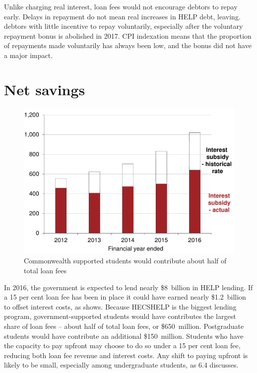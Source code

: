 \documentclass[embargoed]{grattan}
\begin{document}
Unlike charging real interest, loan fees would not encourage debtors to repay early.
Delays in repayment do not mean real increases in \gls{HELP} debt, leaving. debtors with little incentive to repay voluntarily, especially after the voluntary repayment bonus is abolished in 2017.
\gls{CPI} indexation means that the proportion of repayments made voluntarily has always been low, and the bonus did not have a major impact.

\section{Net savings}\label{net-savings}

\begin{figure}
\caption{Commonwealth supported students would contribute about half of total loan fees}\label{fig:fig23-Cth-supported-students-would-contr-half-tot-loan-fees}


\includegraphics[page=23]{atlas/Chartpack.pdf}

\end{figure}

In 2016, the government is expected to lend nearly \$8~billion in \gls{HELP} lending.
If a 15 per cent loan fee has been in place it could have earned nearly \$1.2~billion to offset interest costs, as  shows.
Because \gls{HECSHELP} is the biggest lending program, government-supported students would have contributes the largest share of loan fees -- about half of total loan fees, or \$650~million.
Postgraduate students would have contribute an additional \$150~million.
Students who have the capacity to pay upfront may choose to do so under a 15 per cent loan fee, reducing both loan fee revenue and interest costs.
Any shift to paying upfront is likely to be small, especially among undergraduate students, as 6.4 discusses.
\end{document}
